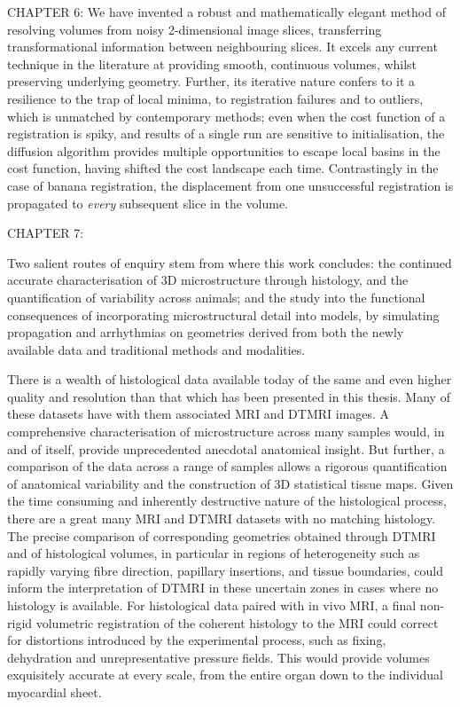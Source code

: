   CHAPTER 6:
  We have invented a robust and mathematically elegant method of resolving volumes from noisy 2-dimensional image slices, transferring transformational information between neighbouring slices. It excels any current technique in the literature at providing smooth, continuous volumes, whilst preserving underlying geometry. Further, its iterative nature confers to it a resilience to the trap of local minima, to registration failures and to outliers, which is unmatched by contemporary methods; even when the cost function of a registration is spiky, and results of a single run are sensitive to initialisation, the diffusion algorithm provides multiple opportunities to escape local basins in the cost function, having shifted the cost landscape each time. Contrastingly in the case of banana registration, the displacement from one unsuccessful registration is propagated to \emph{every} subsequent slice in the volume.
  
  CHAPTER 7:
  
  

  Two salient routes of enquiry stem from where this work concludes: the continued accurate characterisation of 3D microstructure through histology, and the quantification of variability across animals; and the study into the functional consequences of incorporating microstructural detail into models, by simulating propagation and arrhythmias on geometries derived from both the newly available data and traditional methods and modalities.
  
  There is a wealth of histological data available today of the same and even higher quality and resolution than that which has been presented in this thesis. Many of these datasets have with them associated MRI and DTMRI images. A comprehensive characterisation of microstructure across many samples would, in and of itself, provide unprecedented anecdotal anatomical insight. But further, a comparison of the data across a range of samples allows a rigorous quantification of anatomical variability and the construction of 3D statistical tissue maps. Given the time consuming and inherently destructive nature of the histological process, there are a great many MRI and DTMRI datasets with no matching histology. The precise comparison of corresponding geometries obtained through DTMRI and of histological volumes, in particular in regions of heterogeneity such as rapidly varying fibre direction, papillary insertions, and tissue boundaries, could inform the interpretation of DTMRI in these uncertain zones in cases where no histology is available. For histological data paired with in vivo MRI, a final non-rigid volumetric registration of the coherent histology to the MRI could correct for distortions introduced by the experimental process, such as fixing, dehydration and unrepresentative pressure fields. This would provide volumes exquisitely accurate at every scale, from the entire organ down to the individual myocardial sheet.
  
